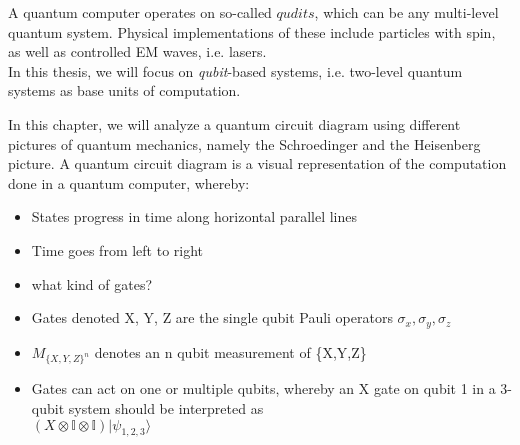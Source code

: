 A quantum computer operates on so-called $qudits$, which can be
any multi-level quantum system. 
Physical implementations of these include particles with 
spin, as well as controlled EM waves, i.e. lasers. \\
In this thesis, we will
focus on \emph{qubit}-based systems, i.e. two-level quantum systems as base 
units of computation.

In this chapter, we will analyze a quantum circuit diagram using different
pictures of quantum mechanics, namely the Schroedinger and the Heisenberg picture.
A quantum circuit diagram is a visual representation of the computation done
in a quantum computer, whereby:
\begin{itemize}
	\item States progress in time along horizontal parallel lines
	\item Time goes from left to right
	\item what kind of gates?
	\item Gates denoted X, Y, Z are the single qubit Pauli operators
		$\sigma_x,\sigma_y,\sigma_z$
    \item $M_{\{X,Y,Z\}^n}$ denotes an n qubit measurement of \{X,Y,Z\}
	\item Gates can act on one or multiple qubits, whereby an X gate 
		on qubit 1 in a 3-qubit system should be interpreted as
		\\$(X\otimes \mathbb{I} \otimes \mathbb{I}) |\psi_{1,2,3}\rangle$
\end{itemize}




\newpage
